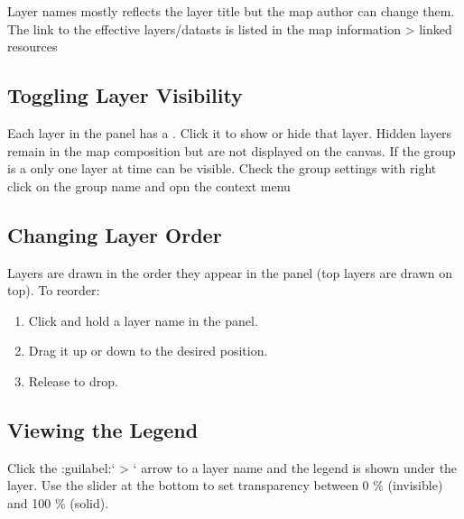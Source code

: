 \documentclass[letterpaper,10pt,english]{sphinxmanual}
\begin{document}
\sphinxAtStartPar
Layer names mostly reflects the layer title but the map author can change them.
The link to the effective layers/datasts is listed in the map information > linked resources


\subsection{Toggling Layer Visibility}
\label{\detokenize{04_exploring_maps:toggling-layer-visibility}}
\sphinxAtStartPar
Each layer in the panel has a  . Click it to show or hide that layer.
Hidden layers remain in the map composition but are not displayed on the canvas.
If the group is a  only one layer at time can be visible.
Check the group settings with right click on the group name and opn the context menu


\subsection{Changing Layer Order}
\label{\detokenize{04_exploring_maps:changing-layer-order}}
\sphinxAtStartPar
Layers are drawn in the order they appear in the panel (top layers are drawn on top).
To reorder:
\begin{enumerate}
%
\item {} 
\sphinxAtStartPar
Click and hold a layer name in the panel.

\item {} 
\sphinxAtStartPar
Drag it up or down to the desired position.

\item {} 
\sphinxAtStartPar
Release to drop.

\end{enumerate}


\subsection{Viewing the Legend}
\label{\detokenize{04_exploring_maps:viewing-the-legend}}
\sphinxAtStartPar
Click the :guilabel:` > ` arrow to a layer name and the legend is shown under the layer.
Use the  slider at the bottom to set transparency between 0 \% (invisible) and 100 \% (solid).
\end{document}
